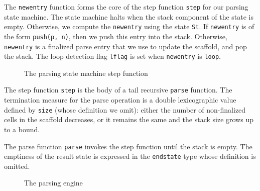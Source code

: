 \documentclass[sigplan,10pt,anonymous,review]{acmart}\settopmatter{printfolios=true,printccs=false,printacmref=false}
\begin{document}
\begin{CCSXML}
%   

The \texttt{newentry} function forms the core of the step function \texttt{step}
for our parsing state machine.  The state machine halts when
the stack component of the state is empty.  Otherwise,
we compute the \texttt{newentry} using the state \texttt{St}.
If \texttt{newentry} is of the form \texttt{push(p, n)}, then
we push this entry into the stack.  Otherwise, \texttt{newentry}
is a finalized parse entry that we use to update the scaffold, and pop the stack.
The loop detection flag \texttt{lflag} is set when \texttt{newentry} is \texttt{loop}.

\begin{figure}[h!]
  
    \vspace*{-4mm}
\caption{\small The parsing state machine step function}
\label{pvs:step}
\end{figure}

The step function \texttt{step} is the body of a tail recursive \texttt{parse} function.  The termination measure for the parse operation is a double lexicographic
value defined by \texttt{size} (whose definition we omit):
either the number of non-finalized cells in the scaffold decreases,
or it remains the same and the stack size grows up to a bound.  

% 


%   

The parse function \texttt{parse} invokes the step function until
the stack is empty.  The emptiness of the result state is expressed
in the \texttt{endstate} type whose definition is omitted.  
\begin{figure}[h!]
  
    \vspace*{-4mm}
\caption{\small The parsing engine}
\label{pvs:parser}
\end{figure}


\end{CCSXML}
\end{document}
